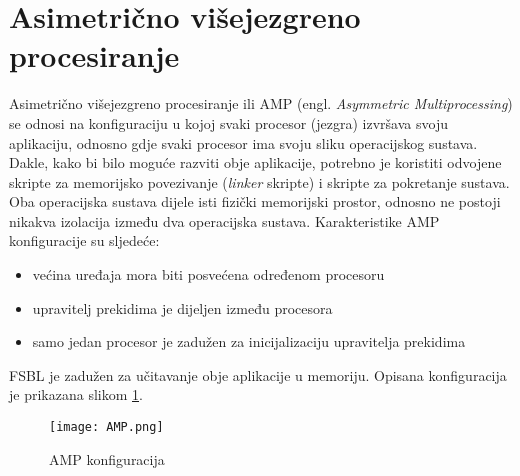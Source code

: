 \documentclass[times, utf8, diplomski, numeric]{fer}
\begin{document}
\section{Asimetrično višejezgreno procesiranje}
Asimetrično višejezgreno procesiranje ili AMP (engl. \textit{Asymmetric Multiprocessing}) se odnosi na
konfiguraciju u kojoj svaki procesor (jezgra) izvršava svoju aplikaciju, odnosno gdje svaki procesor ima
svoju sliku operacijskog sustava. Dakle, kako bi bilo moguće razviti obje aplikacije, potrebno je koristiti
odvojene skripte za memorijsko povezivanje (\textit{linker} skripte) i skripte za pokretanje sustava. Oba
operacijska sustava dijele isti fizički memorijski prostor, odnosno ne postoji nikakva izolacija između dva
operacijska sustava. Karakteristike AMP konfiguracije su sljedeće:
\begin{itemize}
  \item{većina uređaja mora biti posvećena određenom procesoru}
  \item{upravitelj prekidima je dijeljen između procesora}
  \item{samo jedan procesor je zadužen za inicijalizaciju upravitelja prekidima}
\end{itemize}
FSBL je zadužen za učitavanje obje aplikacije u memoriju. Opisana konfiguracija je prikazana slikom \ref{amp}.

\begin{figure}[H]
  \centering
	\texttt{[image: AMP.png]}%
	\caption{AMP konfiguracija}
	\label{amp}%
\end{figure}
\end{document}
